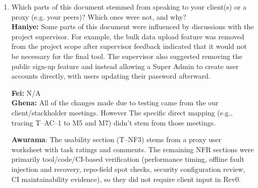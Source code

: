 \documentclass[12pt, titlepage]{article}
\begin{document}
\begin{enumerate}
    \textbf{Fei:} Setting up the testing frameworks was complete, due to the way our project repository was structured. Our code also wasn't as modularized as intended, so many unit tests had to have a lot of mocking in place. The way I resolved them was just adding the testing frameworks earlier, so there was more time to deal with unexpected issues, as opposed to having to cram it all in this week. \\

    \textbf{Ghena:} A significant challenge during this deliverable was ensuring the AHP Ranking Module (M11) was implemented correctly to avoid any methodology misunderstandings. To resolve this, the team held a focused meeting with the supervisor to walk through the exact calculation requirements and conducted a thorough review of the assigned research paper.

    \textbf{Awurama}:  Some planned tests were not feasible in Rev0 (domain filter no-op, HTTP 429 not reproducible, backup/restore requires DB-level procedure). We reported what we could verify, marked missing items as \emph{Not tested}/\emph{Pending}, and listed clear next steps. Manual stopwatch timing also adds reaction-time error, so we documented the method and treated results as conservative upper bounds.

  \item Which parts of this document stemmed from speaking to your client(s) or
  a proxy (e.g. your peers)? Which ones were not, and why?\\

  \textbf{Haniye:} Some parts of this document were influenced by discussions
    with the project supervisor. For example, the bulk data upload feature was removed from the project scope after supervisor feedback
    indicated that it would not be necessary for the final tool. The
    supervisor also suggested removing the public sign-up feature and
    instead allowing a Super Admin to create user accounts directly, with
    users updating their password afterward.

  \textbf{Fei:} N/A\\

  \textbf{Ghena:} All of the changes made due to testing came from the our client/stackholder meetings. However The specific direct mapping (e.g., tracing T–AC–1 to M5 and M7) didn't stem from those meetings.

  \textbf{Awurama}: The usability section (T--NF3) stems from a proxy user worksheet with task ratings and comments. The remaining NFR sections were primarily tool/code/CI-based verification (performance timing, offline fault injection and recovery, repo-field spot checks, security configuration review, CI maintainability evidence), so they did not require client input in Rev0.


\end{enumerate}
\end{document}
